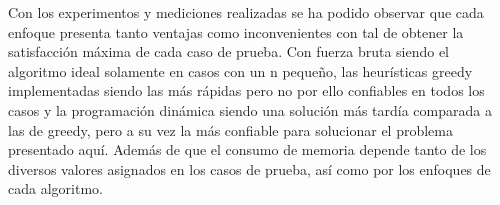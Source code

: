 Con los experimentos y mediciones realizadas se ha podido observar que cada enfoque presenta tanto ventajas
como inconvenientes con tal de obtener la satisfacción máxima de cada caso de prueba. Con fuerza bruta siendo el algoritmo ideal
solamente en casos con un n pequeño, las heurísticas greedy implementadas siendo las más rápidas pero no por ello confiables en todos los casos y
la programación dinámica siendo una solución más tardía comparada a las de greedy, pero a su vez la más confiable para solucionar el problema presentado aquí.
Además de que el consumo de memoria depende tanto de los diversos valores asignados en los casos de prueba, así como por los enfoques de cada algoritmo.
